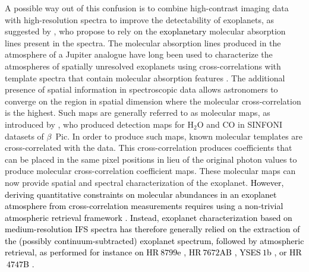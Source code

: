 \documentclass{aa}
\newcommand{\newchange}[1]{\textcolor{black}{#1}}
\begin{document}
A possible way out of this confusion is %
to combine high-contrast imaging data with high-resolution spectra to improve the detectability of exoplanets, as suggested by \citet{2015Snellen}, who propose to rely on the \newchange{exoplanetary} molecular absorption lines present in the spectra.
The molecular absorption lines produced in the atmosphere of a Jupiter analogue  have long been used to characterize the atmospheres of spatially unresolved exoplanets using cross-correlations with template spectra \cite[e.g.][]{snellen2010orbital,birkby2013detection} that contain molecular absorption features \citep[e.g.][]{2003BTsettl}.
The additional presence of spatial information in spectroscopic data allows astronomers to converge on the region in spatial dimension where the molecular cross-correlation is the highest.
Such maps are generally referred to as molecular maps, as introduced by \citet{2018AHoeijmakersMM}, who produced detection maps for \rm{H$_2$O} and \rm{CO} in SINFONI datasets of $\beta$~Pic.
In order to produce such maps, known molecular templates are cross-correlated with the data.
This cross-correlation produces coefficients that can be placed in the same pixel positions in lieu of the original photon values to produce molecular cross-correlation coefficient maps.
These molecular maps can now provide spatial and spectral characterization of the exoplanet.
\newchange{However, deriving quantitative constraints on molecular abundances in an exoplanet atmosphere from cross-correlation measurements requires using a non-trivial atmospheric retrieval framework \citep{Brogi2019}. Instead, exoplanet characterization based on medium-resolution IFS spectra has therefore generally relied on the extraction of the (possibly continuum-subtracted) exoplanet spectrum, followed by atmospheric retrieval, as performed for instance on HR$~8799$e \citep[][]{2020MolliereHR8799e}, HR$~7672$AB \citep[][]{2022WangHR7672AB}, YSES$~1$b \citep[][]{2022Zhang}, or HR$~4747$B \citep[][]{2022Xuan4747B}.}
\end{document}
